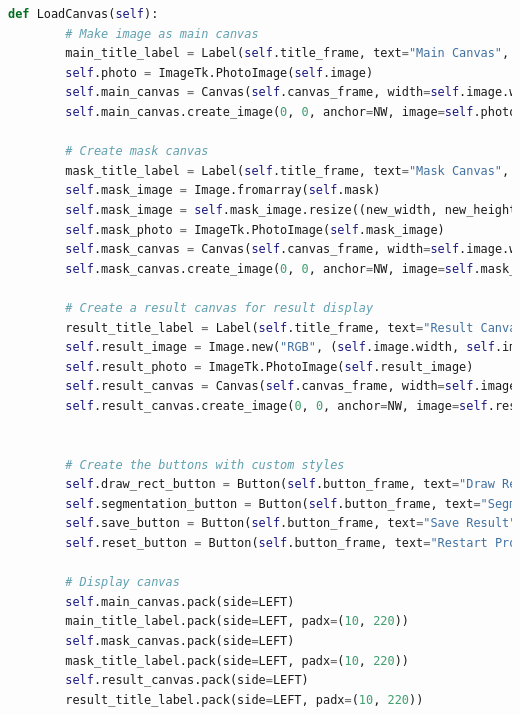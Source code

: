 \begin{lstlisting}[language=Python, basicstyle=\tiny]
    def LoadCanvas(self):    
        # Make image as main canvas
        main_title_label = Label(self.title_frame, text="Main Canvas", font=('Helvetica', 10, 'bold'))
        self.photo = ImageTk.PhotoImage(self.image)
        self.main_canvas = Canvas(self.canvas_frame, width=self.image.width, height=self.image.height)
        self.main_canvas.create_image(0, 0, anchor=NW, image=self.photo)

        # Create mask canvas
        mask_title_label = Label(self.title_frame, text="Mask Canvas", font=('Helvetica', 10, 'bold'))
        self.mask_image = Image.fromarray(self.mask)
        self.mask_image = self.mask_image.resize((new_width, new_height)) # <-- untuk resize ukuran
        self.mask_photo = ImageTk.PhotoImage(self.mask_image)
        self.mask_canvas = Canvas(self.canvas_frame, width=self.image.width, height=self.image.height)
        self.mask_canvas.create_image(0, 0, anchor=NW, image=self.mask_photo)

        # Create a result canvas for result display
        result_title_label = Label(self.title_frame, text="Result Canvas", font=('Helvetica', 10, 'bold'))
        self.result_image = Image.new("RGB", (self.image.width, self.image.height))
        self.result_photo = ImageTk.PhotoImage(self.result_image)
        self.result_canvas = Canvas(self.canvas_frame, width=self.image.width, height=self.image.height)
        self.result_canvas.create_image(0, 0, anchor=NW, image=self.result_photo)

        
        # Create the buttons with custom styles
        self.draw_rect_button = Button(self.button_frame, text="Draw Rectangle", command=self.drawing_rectangle, bg='#4CAF50', fg='white', font=('Helvetica', 10))
        self.segmentation_button = Button(self.button_frame, text="Segmentation Grabcut", command=self.segmentation_image, bg='#2196F3', fg='white', font=('Helvetica', 10))
        self.save_button = Button(self.button_frame, text="Save Result", command=self.save_result_image, bg='#FFC107', fg='black', font=('Helvetica', 10))
        self.reset_button = Button(self.button_frame, text="Restart Program", command=self.reset_image, bg='#607D8B', fg='white', font=('Helvetica', 10))
        
        # Display canvas
        self.main_canvas.pack(side=LEFT)
        main_title_label.pack(side=LEFT, padx=(10, 220))
        self.mask_canvas.pack(side=LEFT)
        mask_title_label.pack(side=LEFT, padx=(10, 220))
        self.result_canvas.pack(side=LEFT)
        result_title_label.pack(side=LEFT, padx=(10, 220))


\end{lstlisting}
